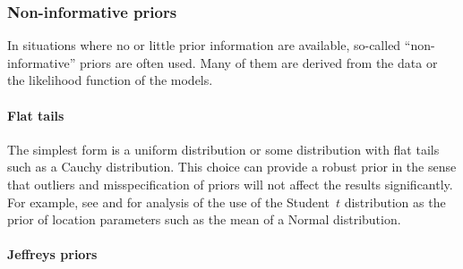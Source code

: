 \subsubsection{Non-informative priors}
\label{ssub:Non-informative priors}

In situations where no or little prior information are available, so-called
``non-informative'' priors are often used. Many of them are derived from the
data or the likelihood function of the models.

\paragraph{Flat tails}

The simplest form is a uniform distribution or some distribution with flat
tails such as a Cauchy distribution. This choice can provide a robust prior
in the sense that outliers and misspecification of priors will not affect the
results significantly. For example, see \cite{OHagan:1990vx} and
\cite{Fan:1992vx} for analysis of the use of the Student~$t$ distribution as
the prior of location parameters such as the mean of a Normal distribution.

\paragraph{Jeffreys priors}

